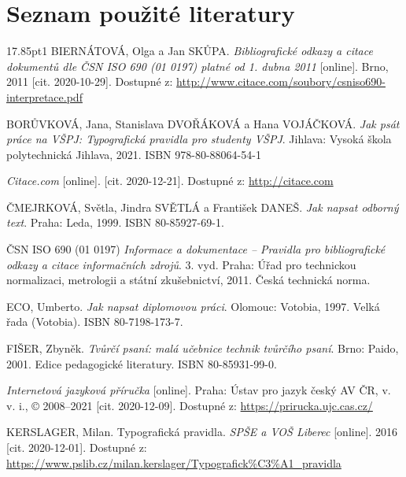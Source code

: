 \chapter*{Seznam použité literatury}

\vspace{-3pt}  %
\begingroup
\raggedright{}  %
\begin{hangparas}{17.85pt}{1}
\noindent BIERNÁTOVÁ, Olga a Jan SKŮPA. \textit{Bibliografické odkazy a citace dokumentů dle ČSN ISO 690 (01 0197) platné od 1. dubna 2011} [online]. Brno, 2011 [cit. 2020-10-29]. Dostupné z: \url{http://www.citace.com/soubory/csniso690-interpretace.pdf}

\noindent BORŮVKOVÁ, Jana, Stanislava DVOŘÁKOVÁ a Hana VOJÁČKOVÁ. \textit{Jak psát práce na VŠPJ: Typografická pravidla pro studenty VŠPJ}. Jihlava: Vysoká škola polytechnická Jihlava, 2021. ISBN 978-80-88064-54-1

\noindent \textit{Citace.com} [online]. [cit. 2020-12-21]. Dostupné z: \url{http://citace.com}

\noindent ČMEJRKOVÁ, Světla, Jindra SVĚTLÁ a František DANEŠ. \textit{Jak napsat odborný text}. Praha: Leda, 1999. ISBN 80-85927-69-1.

\noindent ČSN ISO 690 (01 0197) \textit{Informace a dokumentace – Pravidla pro bibliografické odkazy a citace informačních zdrojů}. 3. vyd. Praha: Úřad pro technickou normalizaci, metrologii a státní zkušebnictví, 2011. Česká technická norma.

\noindent ECO, Umberto. \textit{Jak napsat diplomovou práci}. Olomouc: Votobia, 1997. Velká řada (Votobia). ISBN 80-7198-173-7.

\noindent FIŠER, Zbyněk. \textit{Tvůrčí psaní: malá učebnice technik tvůrčího psaní}. Brno: Paido, 2001. Edice pedagogické literatury. ISBN 80-85931-99-0.

\noindent \textit{Internetová jazyková příručka} [online]. Praha: Ústav pro jazyk český AV ČR, v. v. i., © 2008–2021 [cit. 2020-12-09]. Dostupné z: \url{https://prirucka.ujc.cas.cz/}

\noindent KERSLAGER, Milan. Typografická pravidla. \textit{SPŠE a VOŠ Liberec} [online]. 2016 [cit. 2020-12-01]. Dostupné z: \url{https://www.pslib.cz/milan.kerslager/Typografick\%C3\%A1\_pravidla}


\end{hangparas}
